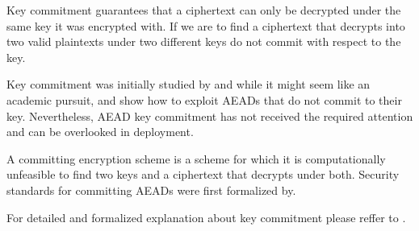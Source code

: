Key commitment guarantees that a ciphertext can only be decrypted under the same key it was encrypted with.
If we are to find a ciphertext that decrypts into two valid plaintexts under two different keys do not commit with respect to the key.

Key commitment was initially studied by \cite{for17} and while it might seem like an academic pursuit, \cite{dgrw18} and \cite{glr17} show how to exploit AEADs that do not commit to their key.
Nevertheless, AEAD key commitment has not received the required attention and can be overlooked in deployment.

A committing encryption scheme is a scheme for which it is computationally unfeasible to find two keys and a ciphertext that decrypts under both.
Security standards for committing AEADs were first formalized by\cite{for17}.

\hfill \break

For detailed and formalized explanation about key commitment please reffer to \cite{gueron20}.